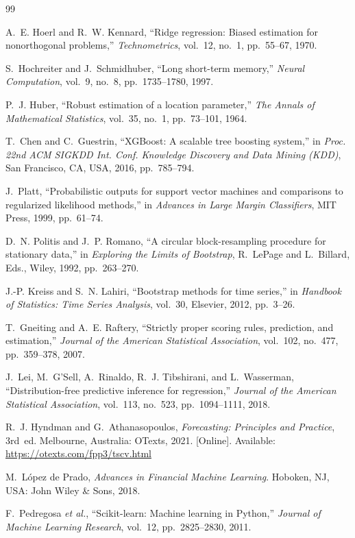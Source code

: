 \documentclass[12pt,a4paper]{report}
\begin{document}
\clearpage
{}
{}
\begingroup
\small
\begin{thebibliography}{99}
\setlength{\itemsep}{2pt}
\setlength{\parsep}{0pt}

A.~E. Hoerl and R.~W. Kennard, ``Ridge regression: Biased estimation for nonorthogonal problems,'' \textit{Technometrics}, vol.~12, no.~1, pp.~55--67, 1970.

S.~Hochreiter and J.~Schmidhuber, ``Long short-term memory,'' \textit{Neural Computation}, vol.~9, no.~8, pp.~1735--1780, 1997.

P.~J. Huber, ``Robust estimation of a location parameter,'' \textit{The Annals of Mathematical Statistics}, vol.~35, no.~1, pp.~73--101, 1964.

T.~Chen and C.~Guestrin, ``XGBoost: A scalable tree boosting system,'' in \textit{Proc. 22nd ACM SIGKDD Int. Conf. Knowledge Discovery and Data Mining (KDD)}, San Francisco, CA, USA, 2016, pp.~785--794.

J.~Platt, ``Probabilistic outputs for support vector machines and comparisons to regularized likelihood methods,'' in \textit{Advances in Large Margin Classifiers}, MIT Press, 1999, pp.~61--74.

D.~N. Politis and J.~P. Romano, ``A circular block-resampling procedure for stationary data,'' in \textit{Exploring the Limits of Bootstrap}, R.~LePage and L.~Billard, Eds., Wiley, 1992, pp.~263--270.

J.-P. Kreiss and S.~N. Lahiri, ``Bootstrap methods for time series,'' in \textit{Handbook of Statistics: Time Series Analysis}, vol.~30, Elsevier, 2012, pp.~3--26.

T.~Gneiting and A.~E. Raftery, ``Strictly proper scoring rules, prediction, and estimation,'' \textit{Journal of the American Statistical Association}, vol.~102, no.~477, pp.~359--378, 2007.

J.~Lei, M.~G'Sell, A.~Rinaldo, R.~J. Tibshirani, and L.~Wasserman, ``Distribution-free predictive inference for regression,'' \textit{Journal of the American Statistical Association}, vol.~113, no.~523, pp.~1094--1111, 2018.

R.~J. Hyndman and G.~Athanasopoulos, \textit{Forecasting: Principles and Practice}, 3rd~ed. Melbourne, Australia: OTexts, 2021. [Online]. Available: \url{https://otexts.com/fpp3/tscv.html}

M.~López de Prado, \textit{Advances in Financial Machine Learning}. Hoboken, NJ, USA: John Wiley \& Sons, 2018.

F.~Pedregosa \textit{et al.}, ``Scikit-learn: Machine learning in Python,'' \textit{Journal of Machine Learning Research}, vol.~12, pp.~2825--2830, 2011.

\end{thebibliography}
\endgroup
\end{document}
